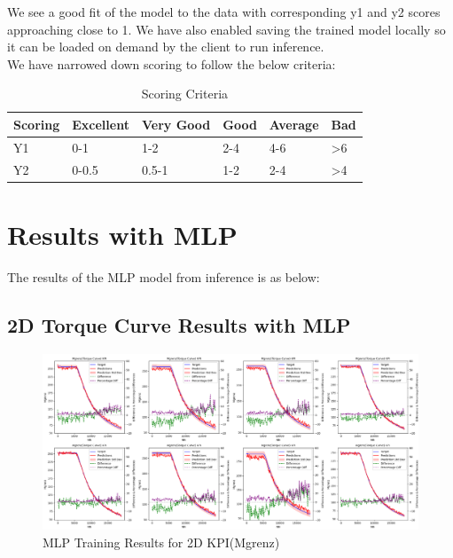 \documentclass{report} %
\begin{document}
We see a good fit of the model to the data with corresponding y1 and y2 scores approaching close to 1.
We have also enabled saving the trained model locally so it can be loaded on demand by the client to run inference.\\

We have narrowed down scoring to follow the below criteria:

\begin{table}[H]
    \centering
    \begin{tabularx}{1\linewidth}{|X|X|X|X|X|X|}
    \hline {\bf Scoring} & {\bf Excellent} & {\bf Very Good} & {\bf Good} & {\bf Average} & {\bf Bad}\\
    \hline 
    Y1 & 0-1 & 1-2 & 2-4 & 4-6 & \textgreater 6\\
    Y2 & 0-0.5 & 0.5-1 & 1-2 & 2-4 & \textgreater 4\\
    \hline
    \end{tabularx}
    \caption{Scoring Criteria}
    \label{tab:Scoring Criteria}
\end{table}


\section{Results with \ac{MLP}}\label{sec:Results with MLP}

The results of the \ac{MLP} model from inference is as below: \\

\subsection{2D Torque Curve Results with \ac{MLP}}\label{sec:2D Torque Curve Results with MLP}

\begin{figure}[H]
    \centering
    \includegraphics[width=1\textwidth]{./ReportImages/KPI2D_predictions.png} 
    \caption{MLP Training Results for 2D KPI(Mgrenz)} 
    \label{fig:MLP Training Results for 2D KPI(Mgrenz)}
\end{figure}
\end{document}
